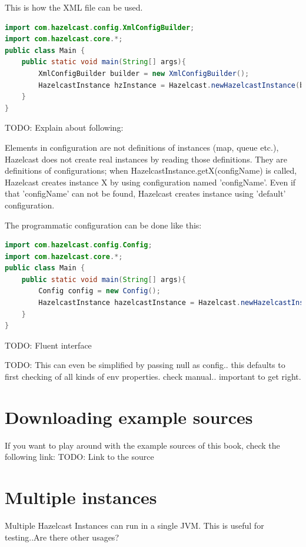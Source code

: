 This is how the XML file can be used.
\begin{lstlisting}[language=java]
import com.hazelcast.config.XmlConfigBuilder;
import com.hazelcast.core.*;
public class Main {
    public static void main(String[] args){
        XmlConfigBuilder builder = new XmlConfigBuilder();
        HazelcastInstance hzInstance = Hazelcast.newHazelcastInstance(builder.build());
    }
}
\end{lstlisting}

TODO: Explain about following:

Elements in configuration are not definitions of instances (map, queue etc.), Hazelcast does not create real instances by reading those definitions. They are definitions of configurations; when HazelcastInstance.getX(configName) is called, Hazelcast creates instance X by using configuration named 'configName'. Even if that 'configName' can not be found, Hazelcast creates instance using 'default' configuration.

The programmatic configuration can be done like this:

\begin{lstlisting}[language=java]
import com.hazelcast.config.Config;
import com.hazelcast.core.*;
public class Main {
    public static void main(String[] args){
        Config config = new Config();
        HazelcastInstance hazelcastInstance = Hazelcast.newHazelcastInstance(config);
    }
}
\end{lstlisting}
TODO: Fluent interface

TODO: This can even be simplified by passing null as config.. this defaults to first checking of all kinds of env properties. check manual.. important to get right.

\section{Downloading example sources}
If you want to play around with the example sources of this book, check the following link:
TODO: Link to the source

\section{Multiple instances}
Multiple Hazelcast Instances can run in a single JVM. This is useful for testing..Are there other usages?

